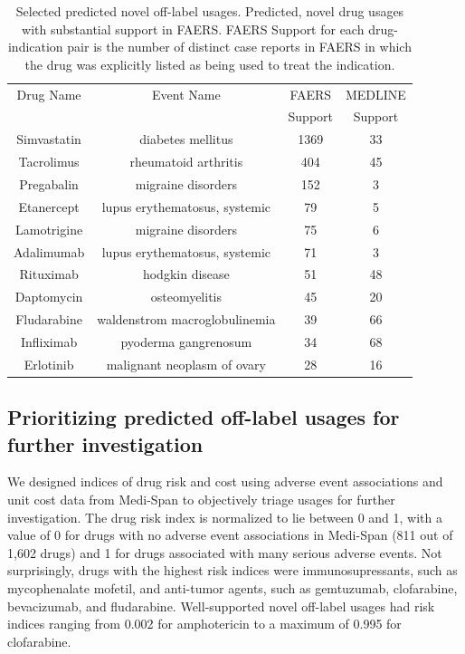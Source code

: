 \begin{table}
\begin{center}
\begin{tabular}{|c|c|c|c||}
  \hline Drug Name & Event Name & FAERS & MEDLINE \\ & & Support &
  Support \\ \hline\hline Simvastatin & diabetes mellitus & 1369 & 33
  \\ Tacrolimus & rheumatoid arthritis & 404 & 45 \\ Pregabalin &
  migraine disorders & 152 & 3 \\ Etanercept & lupus erythematosus,
  systemic & 79 & 5 \\ Lamotrigine & migraine disorders & 75 & 6
  \\ Adalimumab & lupus erythematosus, systemic & 71 & 3 \\ Rituximab
  & hodgkin disease & 51 & 48 \\ Daptomycin & osteomyelitis & 45 & 20
  \\ Fludarabine & waldenstrom macroglobulinemia & 39 & 66
  \\ Infliximab & pyoderma gangrenosum & 34 & 68 \\ Erlotinib &
  malignant neoplasm of ovary & 28 & 16 \\ \hline
\end{tabular}
\end{center}
\caption[Selected predicted novel off-label usages]{Selected predicted
  novel off-label usages.  Predicted, novel drug usages with
  substantial support in FAERS.  FAERS Support for each
  drug-indication pair is the number of distinct case reports in FAERS
  in which the drug was explicitly listed as being used to treat the
  indication.  }
\end{table}


\subsection{Prioritizing predicted off-label usages for further investigation}
We designed indices of drug risk and cost using adverse event
associations and unit cost data from Medi-Span to objectively triage
usages for further investigation. The drug risk index is normalized to
lie between 0 and 1, with a value of 0 for drugs with no adverse event
associations in Medi-Span (811 out of 1,602 drugs) and 1 for drugs
associated with many serious adverse events.  Not surprisingly, drugs
with the highest risk indices were immunosupressants, such as
mycophenalate mofetil, and anti-tumor agents, such as gemtuzumab,
clofarabine, bevacizumab, and fludarabine.  Well-supported novel
off-label usages had risk indices ranging from 0.002 for amphotericin
to a maximum of 0.995 for clofarabine.


